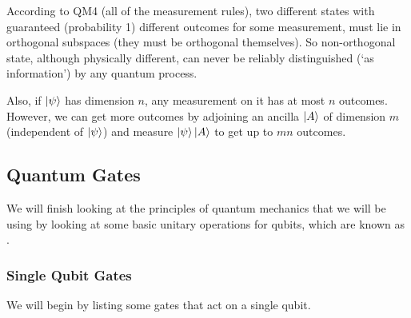 \documentclass[a4paper]{article}
\begin{document}
\begin{remark}
	According to QM4 (all of the measurement rules), two different states with guaranteed (probability 1) different outcomes for some measurement, must lie in orthogonal subspaces (they must be orthogonal themselves). So non-orthogonal state, although physically different, can never be reliably distinguished (`as information') by any quantum process.

	Also, if $\ket{\psi}$ has dimension $n$, any measurement on it has at most $n$ outcomes. However, we can get more outcomes by adjoining an ancilla $\ket{A}$ of dimension $m$ (independent of $\ket{\psi}$) and measure $\ket{\psi}\ket{A}$ to get up to $mn$ outcomes. 
\end{remark}

\subsection{Quantum Gates}

We will finish looking at the principles of quantum mechanics that we will be using by looking at some basic unitary operations for qubits, which are known as .

\subsubsection{Single Qubit Gates}

We will begin by listing some gates that act on a single qubit.
\end{document}

